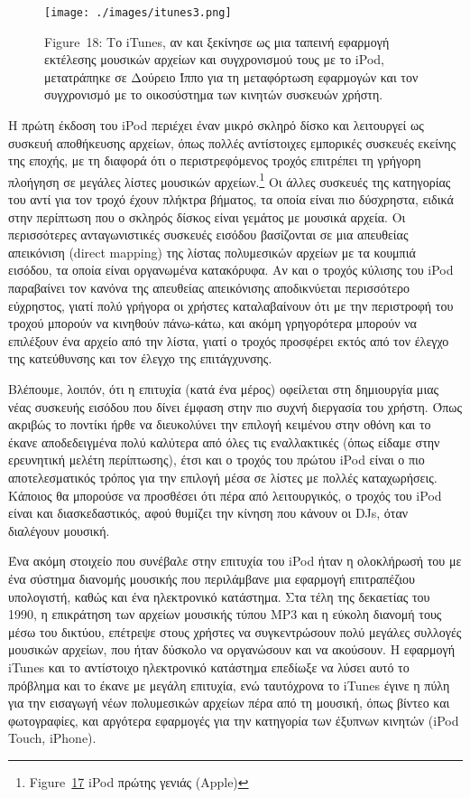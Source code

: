 \documentclass[
]{article}
\begin{document}
\leavevmode{}%
\begin{figure}
\hypertarget{fig:itunes3}{%
\centering
\texttt{[image: ./images/itunes3.png]}
\caption{Figure~18: Το iTunes, αν και ξεκίνησε ως μια ταπεινή εφαρμογή
εκτέλεσης μουσικών αρχείων και συγχρονισμού τους με το iPod, μετατράπηκε
σε Δούρειο Ίππο για τη μεταφόρτωση εφαρμογών και τον συγχρονισμό με το
οικοσύστημα των κινητών συσκευών χρήστη.}\label{fig:itunes3}
}
\end{figure}

Η πρώτη έκδοση του iPod περιέχει έναν μικρό σκληρό δίσκο και λειτουργεί
ως συσκευή αποθήκευσης αρχείων, όπως πολλές αντίστοιχες εμπορικές
συσκευές εκείνης της εποχής, με τη διαφορά ότι ο περιστρεφόμενος τροχός
επιτρέπει τη γρήγορη πλοήγηση σε μεγάλες λίστες μουσικών
αρχείων.\footnote{Figure~\protect\hyperlink{fig:ipod_1g}{17} iPod πρώτης
  γενιάς (Apple)} Οι άλλες συσκευές της κατηγορίας του αντί για τον
τροχό έχουν πλήκτρα βήματος, τα οποία είναι πιο δύσχρηστα, ειδικά στην
περίπτωση που ο σκληρός δίσκος είναι γεμάτος με μουσικά αρχεία. Οι
περισσότερες ανταγωνιστικές συσκευές εισόδου βασίζονται σε μια απευθείας
απεικόνιση (direct mapping) της λίστας πολυμεσικών αρχείων με τα κουμπιά
εισόδου, τα οποία είναι οργανωμένα κατακόρυφα. Αν και ο τροχός κύλισης
του iPod παραβαίνει τον κανόνα της απευθείας απεικόνισης αποδικνύεται
περισσότερο εύχρηστος, γιατί πολύ γρήγορα οι χρήστες καταλαβαίνουν ότι
με την περιστροφή του τροχού μπορούν να κινηθούν πάνω-κάτω, και ακόμη
γρηγορότερα μπορούν να επιλέξουν ένα αρχείο από την λίστα, γιατί ο
τροχός προσφέρει εκτός από τον έλεγχο της κατεύθυνσης και τον έλεγχο της
επιτάγχυνσης.

Βλέπουμε, λοιπόν, ότι η επιτυχία (κατά ένα μέρος) οφείλεται στη
δημιουργία μιας νέας συσκευής εισόδου που δίνει έμφαση στην πιο συχνή
διεργασία του χρήστη. Όπως ακριβώς το ποντίκι ήρθε να διευκολύνει την
επιλογή κειμένου στην οθόνη και το έκανε αποδεδειγμένα πολύ καλύτερα από
όλες τις εναλλακτικές (όπως είδαμε στην ερευνητική μελέτη περίπτωσης),
έτσι και ο τροχός του πρώτου iPod είναι ο πιο αποτελεσματικός τρόπος για
την επιλογή μέσα σε λίστες με πολλές καταχωρήσεις. Κάποιος θα μπορούσε
να προσθέσει ότι πέρα από λειτουργικός, ο τροχός του iPod είναι και
διασκεδαστικός, αφού θυμίζει την κίνηση που κάνουν οι DJs, όταν
διαλέγουν μουσική.

Ένα ακόμη στοιχείο που συνέβαλε στην επιτυχία του iPod ήταν η ολοκλήρωσή
του με ένα σύστημα διανομής μουσικής που περιλάμβανε μια εφαρμογή
επιτραπέζιου υπολογιστή, καθώς και ένα ηλεκτρονικό κατάστημα. Στα τέλη
της δεκαετίας του 1990, η επικράτηση των αρχείων μουσικής τύπου MP3 και
η εύκολη διανομή τους μέσω του δικτύου, επέτρεψε στους χρήστες να
συγκεντρώσουν πολύ μεγάλες συλλογές μουσικών αρχείων, που ήταν δύσκολο
να οργανώσουν και να ακούσουν. Η εφαρμογή iTunes και το αντίστοιχο
ηλεκτρονικό κατάστημα επεδίωξε να λύσει αυτό το πρόβλημα και το έκανε με
μεγάλη επιτυχία, ενώ ταυτόχρονα το iTunes έγινε η πύλη για την εισαγωγή
νέων πολυμεσικών αρχείων πέρα από τη μουσική, όπως βίντεο και
φωτογραφίες, και αργότερα εφαρμογές για την κατηγορία των έξυπνων
κινητών (iPod Touch, iPhone).
\end{document}
